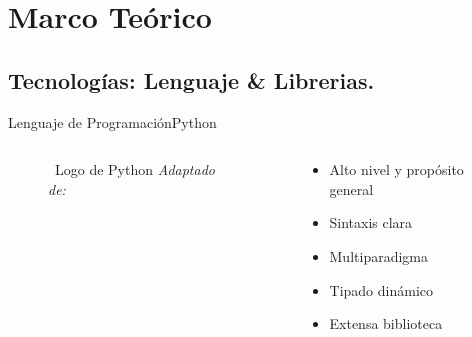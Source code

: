 \section{Marco Teórico}
\subsection[Tecnologías]{Tecnologías: Lenguaje \& Librerias.}

\begin{frame}{Lenguaje de Programación}{Python}
    \begin{columns}
        \begin{column}{0.4\textwidth}
            \centering
            \begin{figure}[H]
                \centering
                \vspace{-0.25cm}
                \caption{\tiny~Logo de Python \textit{Adaptado de:}~\cite{PythonSoftwareFoundation}}%
                \label{fig:Python_logo}
            \end{figure}
        \end{column}
        \begin{column}{0.6\textwidth}
            \begin{itemize}
                \item Alto nivel y propósito general
                \item Sintaxis clara
                \item Multiparadigma
                \item Tipado dinámico
                \item Extensa biblioteca
            \end{itemize}
        \end{column}
    \end{columns}
\end{frame}

